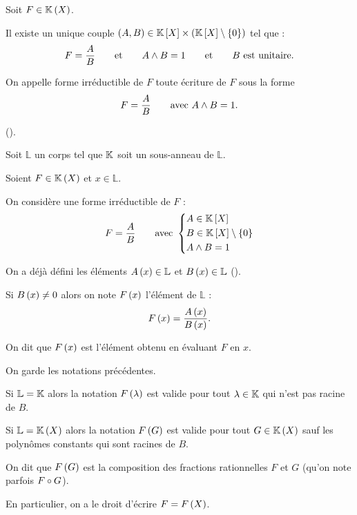 \begin{defprop}
Soit \(F\in\fracrat\).

Il existe un unique couple \(\paren{A,B}\in\poly\times\paren{\poly\excluant\accol{0}}\) tel que : \[F=\dfrac{A}{B}\qquad\text{et}\qquad A\land B=1\qquad\text{et}\qquad B\text{ est unitaire}.\]

On appelle forme irréductible de \(F\) toute écriture de \(F\) sous la forme \[F=\dfrac{A}{B}\qquad\text{avec }A\land B=1.\]
\end{defprop}

\begin{dem}
 (\cf {}).
\end{dem}

\begin{nota}
\renewcommand{\L}{\mathbb{L}}
Soit \(\L\) un corps tel que \(\mathbb{K}\) soit un sous-anneau de \(\L\).

Soient \(F\in\fracrat\) et \(x\in\L\).

On considère une forme irréductible de \(F\) : \[F=\dfrac{A}{B}\qquad\text{avec }\begin{dcases}A\in\poly \\ B\in\poly\excluant\accol{0} \\ A\et B=1\end{dcases}\]

On a déjà défini les éléments \(A\paren{x}\in\L\) et \(B\paren{x}\in\L\) (\cf {}).

Si \(B\left(x\right)\not=0\) alors on note \(F\left(x\right)\) l'élément de \(\L\) : \[F\left(x\right)=\dfrac{A\left(x\right)}{B\left(x\right)}.\]

On dit que \(F\left(x\right)\) est l'élément obtenu en évaluant \(F\) en \(x\).
\end{nota}

\begin{ex}
On garde les notations précédentes.

Si \(\L=\K\) alors la notation \(F\left(\lambda\right)\) est valide pour tout \(\lambda\in\mathbb{K}\) qui n'est pas racine de \(B\).

Si \(\L=\fracrat\) alors la notation \(F\left(G\right)\) est valide pour tout \(G\in\fracrat\) sauf les polynômes constants qui sont racines de \(B\).

On dit que \(F\left(G\right)\) est la composition des fractions rationnelles \(F\) et \(G\) (qu'on note parfois \(F\circ G\)).

En particulier, on a le droit d'écrire \(F=F\left(X\right)\).
\end{ex}


